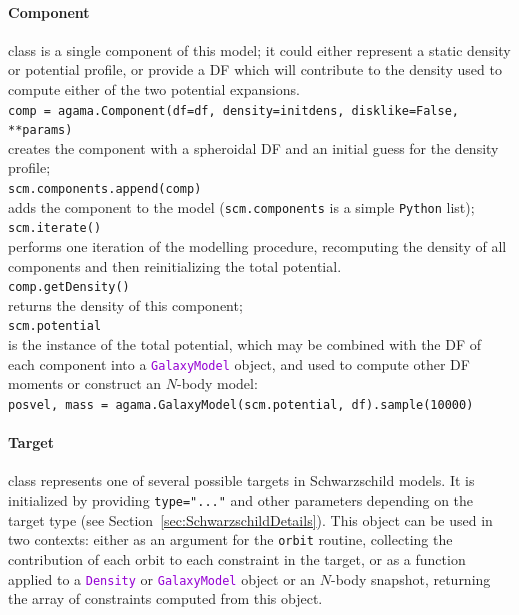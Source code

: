 \documentclass[12pt]{article}
\newcommand{\Python}{\texttt{Python}\xspace}
\newcommand{\ttt}[1]{\textcolor{darkviolet}{\texttt{#1}}}
\newcommand{\ppp}[1]{\textcolor{darkolive} {\texttt{#1}}}
\begin{document}
\paragraph{Component} class is a single component of this model; it could either represent a static density or potential profile, or provide a DF which will contribute to the density used to compute either of the two potential expansions.\\[2mm]
\texttt{comp = agama.Component(df=df, density=initdens, disklike=False, **params)}\\
creates the component with a spheroidal DF and an initial guess for the density profile;\\[2mm]
\texttt{scm.components.append(comp)}\\
adds the component to the model (\texttt{scm.components} is a simple \Python list);\\[2mm]
\texttt{scm.iterate()}\\
performs one iteration of the modelling procedure, recomputing the density of all components and then reinitializing the total potential.\\[2mm]
\texttt{comp.getDensity()}\\
returns the density of this component; \\[2mm]
\texttt{scm.potential}\\ is the instance of the total potential, which may be combined with the DF of each component into a \ttt{GalaxyModel} object, and used to compute other DF moments or construct an $N$-body model:\\
\texttt{posvel, mass = agama.GalaxyModel(scm.potential, df).sample(10000)}

\paragraph{Target} class represents one of several possible targets in Schwarzschild models. It is initialized by providing \ppp{type="..."} and other parameters depending on the target type (see Section~\ref{sec:SchwarzschildDetails}). This object can be used in two contexts: either as an argument for the \texttt{orbit} routine, collecting the contribution of each orbit to each constraint in the target, or as a function applied to a \ttt{Density} or \ttt{GalaxyModel} object or an $N$-body snapshot, returning the array of constraints computed from this object.
\end{document}
